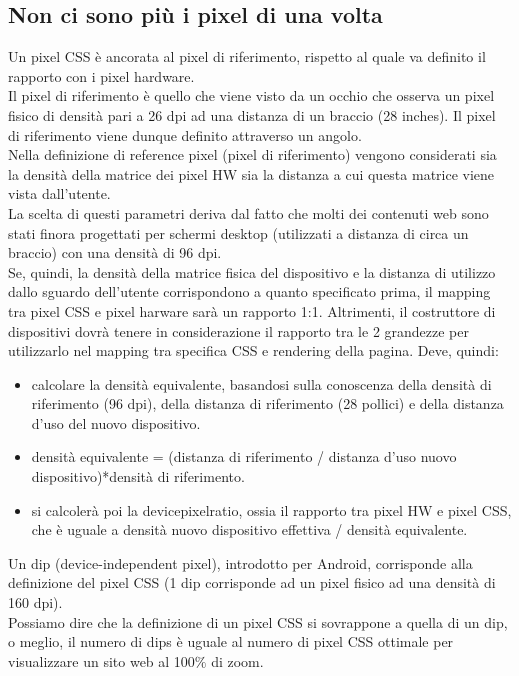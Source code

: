 \documentclass{article}
\begin{document}
\subsection{Non ci sono più i pixel di una volta}
Un pixel CSS è ancorata al pixel di riferimento, rispetto al quale va definito il rapporto con i pixel hardware.\\
Il pixel di riferimento è quello che viene visto da un occhio che osserva un pixel fisico di densità pari a 26 dpi ad una distanza di un braccio (28 inches). Il pixel di riferimento viene dunque definito attraverso un angolo.\\
Nella definizione di reference pixel (pixel di riferimento) vengono considerati sia la densità della matrice dei pixel HW sia la distanza a cui questa matrice viene vista dall'utente.\\
La scelta di questi parametri deriva dal fatto che molti dei contenuti web sono stati finora progettati per schermi desktop (utilizzati a distanza di circa un braccio) con una densità di 96 dpi.\\
Se, quindi, la densità della matrice fisica del dispositivo e la distanza di utilizzo dallo sguardo dell'utente corrispondono a quanto specificato prima, il mapping tra pixel CSS e pixel harware sarà un rapporto 1:1. Altrimenti, il costruttore di dispositivi dovrà tenere in considerazione il rapporto tra le 2 grandezze per utilizzarlo nel mapping tra specifica CSS e rendering della pagina. Deve, quindi:\\
\begin{itemize}
	\item calcolare la densità equivalente, basandosi sulla conoscenza della densità di riferimento (96 dpi), della distanza di riferimento (28 pollici) e della distanza d'uso del nuovo dispositivo.
	\item densità equivalente = (distanza di riferimento / distanza d'uso nuovo dispositivo)*densità di riferimento.
	\item si calcolerà poi la devicepixelratio, ossia il rapporto tra pixel HW e pixel CSS, che è uguale a densità nuovo dispositivo effettiva / densità equivalente.
\end{itemize}
Un dip (device-independent pixel), introdotto per Android, corrisponde alla definizione del pixel CSS (1 dip corrisponde ad un pixel fisico ad una densità di 160 dpi). \\
Possiamo dire che la definizione di un pixel CSS si sovrappone a quella di un dip, o meglio, il numero di dips è uguale al numero di pixel CSS ottimale per visualizzare un sito web al 100$\% $ di zoom.
\end{document}
